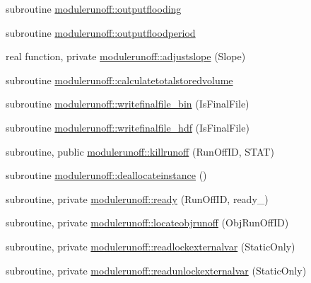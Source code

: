 \begin{DoxyCompactItemize}
\item 
subroutine \mbox{\hyperlink{namespacemodulerunoff_a61882209b1d8802763f9fb32a5f34a38}{modulerunoff\+::outputflooding}}
\item 
subroutine \mbox{\hyperlink{namespacemodulerunoff_ad52912e124d2d30970fdc6d5bd8c15cc}{modulerunoff\+::outputfloodperiod}}
\item 
real function, private \mbox{\hyperlink{namespacemodulerunoff_a5ac5c14875a2f0f2791e37f40b4321ea}{modulerunoff\+::adjustslope}} (Slope)
\item 
subroutine \mbox{\hyperlink{namespacemodulerunoff_a341a4c8ef2509bc0f144f8afd17ece22}{modulerunoff\+::calculatetotalstoredvolume}}
\item 
subroutine \mbox{\hyperlink{namespacemodulerunoff_a2f27139bf5cc235ef3e04522e63d2f5d}{modulerunoff\+::writefinalfile\+\_\+bin}} (Is\+Final\+File)
\item 
subroutine \mbox{\hyperlink{namespacemodulerunoff_af0a5f9cb46a0d94efdb301f1b582b7c4}{modulerunoff\+::writefinalfile\+\_\+hdf}} (Is\+Final\+File)
\item 
subroutine, public \mbox{\hyperlink{namespacemodulerunoff_aa17d0391187f304ab3410eb5d26a4711}{modulerunoff\+::killrunoff}} (Run\+Off\+ID, S\+T\+AT)
\item 
subroutine \mbox{\hyperlink{namespacemodulerunoff_ad9192dfb595b8f16119a042aa13d95c4}{modulerunoff\+::deallocateinstance}} ()
\item 
subroutine, private \mbox{\hyperlink{namespacemodulerunoff_aee0c5b22d517afda2e934847c9da42cb}{modulerunoff\+::ready}} (Run\+Off\+ID, ready\+\_\+)
\item 
subroutine, private \mbox{\hyperlink{namespacemodulerunoff_a573ec5acc76c43856a82166862259a60}{modulerunoff\+::locateobjrunoff}} (Obj\+Run\+Off\+ID)
\item 
subroutine, private \mbox{\hyperlink{namespacemodulerunoff_ae46242484733cacdd1c5d484f4e6eba7}{modulerunoff\+::readlockexternalvar}} (Static\+Only)
\item 
subroutine, private \mbox{\hyperlink{namespacemodulerunoff_a900316fc0130b378405b9b03d84eb9cd}{modulerunoff\+::readunlockexternalvar}} (Static\+Only)
\end{DoxyCompactItemize}
